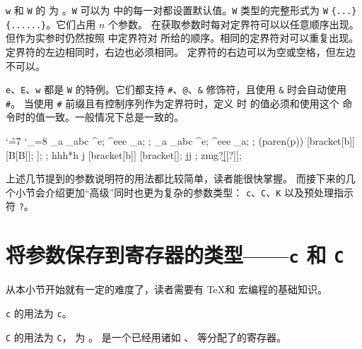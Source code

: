 \documentclass[openany]{book}
\begin{document}
\texttt w 和 \texttt W 的  为 。\texttt W
可以为  中的每一对都设置默认值。\texttt W 类型的完整形式为
\verb|W| 
\texttt{\{...\} 
  \{......\}}。它们占用 $n$ 个参数。
在获取参数时每对定界符可以以任意顺序出现。但作为实参时仍然按照  中定界符对
所给的顺序。相同的定界符对可以重复出现。定界符的左边相同时，右边也必须相同。
定界符的右边可以为空或空格，但左边不可以。

\texttt e、\texttt E、\texttt w 都是 \texttt W 的特例。它们都支持 
\texttt\#、\texttt @、\texttt\& 修饰符，且使用 \texttt\& 时会自动使用 \texttt\#。
当使用 \texttt\# 前缀且有控制序列作为定界符时，定义  时 
 的值必须和使用这个  命令时的值一致。一般情况下总是一致的。

\begin{examcode}{}
\catcode`\^=7 \catcode`\_=8 
\DeclareEKeysCommand {} {\detokenize{[#1|#2|#3]}}
\DeclareEKeysCommand {} {\detokenize{[#1|#2|#3]}}
\DeclareEKeysCommand {} {}
\DeclareEKeysCommand {} {}
\DeclareEKeysCommand {} {}
\ttfamily\small\obeylines
\faa _a _{abc} ^e; \faa ^{eee} _a; \faa ;
\fbb _a _{abc} ^e; \fbb ^{eee} _a; \fbb ;
\fcc (paren(p)) [bracket[b]] [B[B]]; \fcc [bracket[b]]; \fcc ;
\fdd *hhh*h j [bracket[b]] [{bracket[}]; \fdd *jj ;
\fee \a zmg\a ?\b\b [[?]];
\end{examcode}

上述几节提到的参数说明符的用法都比较简单，读者能很快掌握。
而接下来的几个小节会介绍更加“高级”同时也更为复杂的参数类型：
\texttt c、\texttt C、\texttt K 以及预处理指示符 \texttt ?。

\section{将参数保存到寄存器的类型——\texttt c 和 \texttt C}

从本小节开始就有一定的难度了，读者需要有 \TeX 和 \LaTeXiii 宏编程的基础知识。

\texttt c 的用法为 \verb|c|。

\texttt C 的用法为 \verb|C|，
为 。 是一个已经用诸如
、 等分配了的寄存器。
\end{document}
